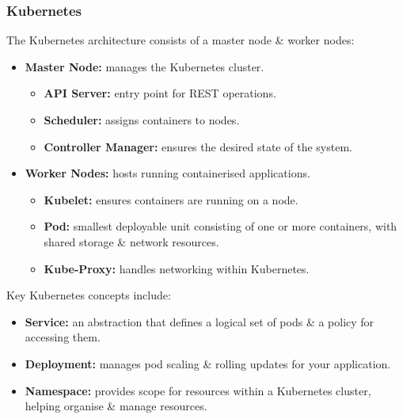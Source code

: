 \documentclass[a4paper,11pt]{article}
\begin{document}
\subsubsection{Kubernetes}
The Kubernetes architecture consists of a master node \& worker nodes:
\begin{itemize}
    \item   \textbf{Master Node:} manages the Kubernetes cluster.
            \begin{itemize}
                \item   \textbf{API Server:} entry point for REST operations.
                \item   \textbf{Scheduler:} assigns containers to nodes.
                \item   \textbf{Controller Manager:} ensures the desired state of the system.
            \end{itemize}
    \item   \textbf{Worker Nodes:} hosts running containerised applications.
            \begin{itemize}
                \item   \textbf{Kubelet:} ensures containers are running on a node.
                \item   \textbf{Pod:} smallest deployable unit consisting of one or more containers, with shared
                        storage \& network resources.
                \item   \textbf{Kube-Proxy:} handles networking within Kubernetes.
            \end{itemize}
\end{itemize}

Key Kubernetes concepts include:
\begin{itemize}
    \item   \textbf{Service:} an abstraction that defines a logical set of pods \& a policy for accessing them.
    \item   \textbf{Deployment:} manages pod scaling \& rolling updates for your application.
    \item   \textbf{Namespace:} provides scope for resources within a Kubernetes cluster, helping organise \& 
            manage resources.
\end{itemize}
\end{document}
